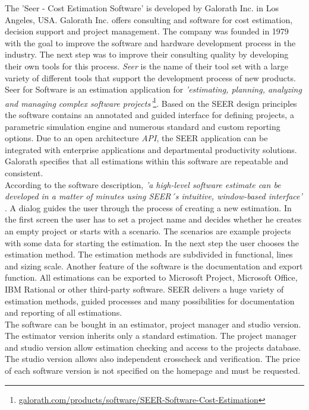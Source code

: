 The 'Seer - Cost Estimation Software' is developed by Galorath Inc. in Los Angeles, USA. Galorath Inc. offers consulting and software for cost estimation, decision support and project management. The company was founded in 1979 with the goal to improve the software and hardware development process in the industry. The next step was to improve their consulting quality by developing their own tools for this process. \textit{Seer} is the name of their tool set with a large variety of different tools that support the development process of new products.
\\
Seer for Software is an estimation application for \textit{'estimating, planning, analyzing and managing complex software projects'}\footnote{\url{galorath.com/products/software/SEER-Software-Cost-Estimation}}. Based on the SEER design principles the software contains an annotated and guided interface for defining projects, a parametric simulation engine and numerous standard and custom reporting options. Due to an open architecture \textit{API}, the SEER application can be integrated with enterprise applications and departmental productivity solutions. Galorath specifies that all estimations within this software are repeatable and consistent.
\\
According to the software description, \textit{'a high-level software estimate can be developed in a matter of minutes using SEER´s intuitive, window-based interface'} \cite{pricesystems}. A dialog guides the user through the process of creating a new estimation. In the first screen the user has to set a project name and decides whether he creates an empty project or starts with a scenario. The scenarios are example projects with some data for starting the estimation. In the next step the user chooses the estimation method. The estimation methods are subdivided in functional, lines and sizing scale. Another feature of the software is the documentation and export function. All estimations can be exported to Microsoft Project, Microsoft Office, IBM Rational or other third-party software. SEER delivers a huge variety of estimation methods, guided processes and many possibilities for documentation and reporting of all estimations.
\\
The software can be bought in an estimator, project manager and studio version. The estimator version inherits only a standard estimation. The project manager and studio version allow estimation checking and access to the projects database. The studio version allows also independent crosscheck and verification. The price of each software version is not specified on the homepage and must be requested.

